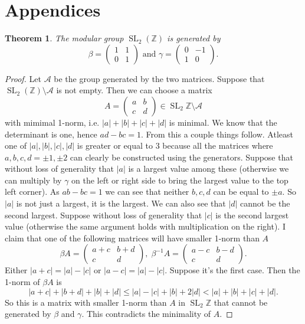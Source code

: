 \documentclass[a4paper]{article}
\theoremstyle{theoremdd}
\newtheorem{theorem}{Theorem}[section]
\theoremstyle{definitiondd}
\theoremstyle{remarkdd}
\newcommand{\Z}{\mathbb{Z}}
\DeclareMathOperator{\SL}{SL}
\begin{document}
\section{Appendices}
\begin{theorem}
	The modular group $\SL_2(\Z)$ is generated by \[ 	
	\beta = \begin{pmatrix}  1 & 1 \\ 0 & 1 \end{pmatrix} 
	\text{ and }
	\gamma =  \begin{pmatrix} 0 & -1 \\ 1 & 0 \end{pmatrix} 
.\] 
\end{theorem}
\begin{proof}
	Let $\mathcal{A} $ be the group generated by the two matrices. 
	Suppose that $\SL_2(\Z) \setminus \mathcal{A} $ is not empty.
	Then we can choose a matrix \[
		A =\begin{pmatrix} a & b \\ c& d\end{pmatrix} \in \SL_2\Z \setminus \mathcal{A} 
	\] 
	with mimimal 1-norm, i.e. $|a| + |b| + |c| + |d|$ is minimal.
	We know that the determinant is one, hence $ad- bc = 1$. From this a couple things follow. Atleast one of  $|a|, |b|,|c|,|d|$ is greater or equal to 3 because all the matrices where $a, b, c, d = \pm 1, \pm 2$ can clearly be constructed using the generators. Suppose that without loss of generality that $|a|$ is a largest value among these (otherwise we can multiply by $\gamma$ on the left or right side to bring the largest value to the top left corner).
	As  $ab - bc = 1$ we can see that neither  $b, c, d$ can be equal to $\pm a$.  
	So  $|a|$ is not just a largest, it is the largest. 
	We can also see that $|d|$ cannot be the second largest. 
	Suppose without loss of generality that $|c|$ is the second largest value (otherwise the same argument holds with multiplication on the right).
	I claim that one of the following matrices will have smaller 1-norm than $A$ \[
		\beta A = \begin{pmatrix} a + c & b + d  \\ c & d\end{pmatrix}, \; \beta^{-1} A = \begin{pmatrix} a - c & b - d \\ c & d \end{pmatrix} 
	.\]
	Either $|a + c| = |a| - |c|$ or  $|a - c| =  |a|  - |c|$. Suppose it's the first case. 
	Then the 1-norm of $\beta A$ is
	 \[
	|a + c| + |b + d| + |b| + |d| \le |a| - |c| + |b| + 2|d| < |a| + |b| + |c| + |d|
	.\] 
	So this is a matrix with smaller 1-norm than $A$ in $\SL_2\Z$ that cannot be generated by $\beta$ and  $\gamma$. 
	This contradicts the minimality of $A$. 
\end{proof}
\end{document}

